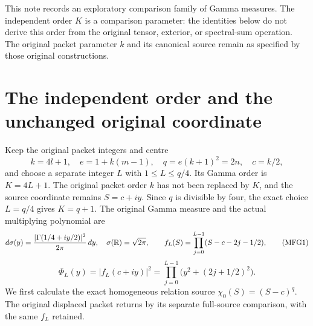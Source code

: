 


This note records an exploratory comparison family of Gamma measures.
The independent order $K$ is a comparison parameter: the identities below
do not derive this order from the original tensor, exterior, or spectral-sum
operation. The original packet parameter $k$ and its canonical source
remain as specified by those original constructions.

\section{The independent order and the unchanged original coordinate}

Keep the original packet integers and centre
\[
 k=4l+1,\quad e=1+k(m-1),\quad q=e(k+1)^2=2n,
 \quad c=k/2,
\]
and choose a separate integer $L$ with $1\le L\le q/4$. Its Gamma
order is $K=4L+1$. The original packet order $k$ has not been replaced
by $K$, and the source coordinate remains $S=c+iy$. Since $q$ is
divisible by four, the exact choice $L=q/4$ gives $K=q+1$.
The original Gamma measure and the actual multiplying polynomial are
\[
 d\sigma(y)=\frac{|\Gamma(1/4+iy/2)|^2}{2\pi}\,dy,
 \quad \sigma(\mathbb R)=\sqrt{2\pi},\qquad
 f_L(S)=\prod_{j=0}^{L-1}(S-c-2j-1/2),
 \tag{MFG1}
\]
\[
 \Phi_L(y)=|f_L(c+iy)|^2
          =\prod_{j=0}^{L-1}\big(y^2+(2j+1/2)^2\big).
 \tag{MFG2}
\]
We first calculate the exact homogeneous relation source
$\chi_0(S)=(S-c)^q$. The original displaced packet returns by its
separate full-source comparison, with the same $f_L$ retained.

